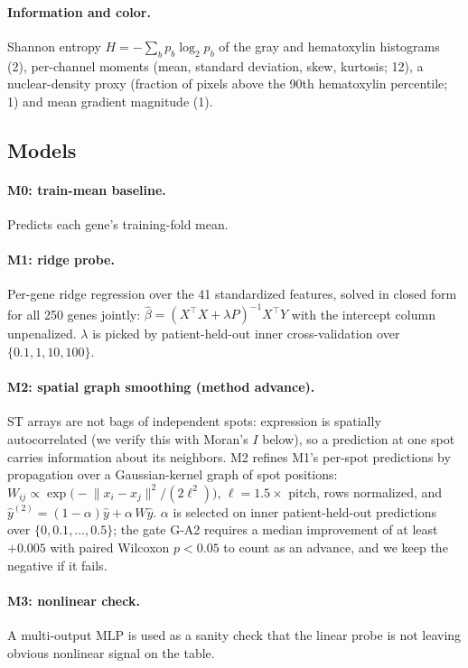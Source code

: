 \documentclass[11pt]{article}
\begin{document}
\paragraph{Information and color.} Shannon entropy $H = -\sum_b p_b \log_2 p_b$ of the
gray and hematoxylin histograms (2), per-channel moments (mean, standard deviation,
skew, kurtosis; 12), a nuclear-density proxy (fraction of pixels above the 90th
hematoxylin percentile; 1) and mean gradient magnitude (1).

\subsection{Models}
\paragraph{M0: train-mean baseline.} Predicts each gene's training-fold mean.
\paragraph{M1: ridge probe.} Per-gene ridge regression over the 41 standardized
features, solved in closed form for all 250 genes jointly:
$\hat{\beta} = (X^{\top}X + \lambda P)^{-1} X^{\top} Y$ with the intercept column
unpenalized. $\lambda$ is picked by patient-held-out inner cross-validation over
$\{0.1, 1, 10, 100\}$.
\paragraph{M2: spatial graph smoothing (method advance).} ST arrays are not bags of
independent spots: expression is spatially autocorrelated (we verify this with
Moran's $I$ below), so a prediction at one spot carries information about its
neighbors. M2 refines M1's per-spot predictions by propagation over a Gaussian-kernel
graph of spot positions:
$W_{ij} \propto \exp\!\big(-\lVert x_i - x_j \rVert^2 / (2\ell^2)\big)$,
$\ell = 1.5 \times$ pitch, rows normalized, and
$\hat{y}^{(2)} = (1-\alpha)\hat{y} + \alpha\, W\hat{y}$.
$\alpha$ is selected on inner patient-held-out predictions over
$\{0, 0.1, \dots, 0.5\}$; the gate G-A2 requires a median improvement of at least
$+0.005$ with paired Wilcoxon $p<0.05$ to count as an advance, and we keep the
negative if it fails.
\paragraph{M3: nonlinear check.} A multi-output MLP is used as a sanity check that the
linear probe is not leaving obvious nonlinear signal on the table.
\end{document}
